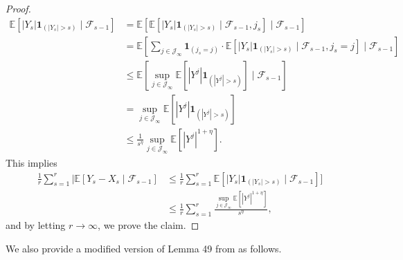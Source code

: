 \documentclass[12pt]{article}
\begin{document}
\begin{proof}
\begin{align*}
\mathbb{E}[ |Y_s| \mathbf{1}_{(|Y_s| > s)} \mid \mathcal{F}_{s-1} ] 
&= \mathbb{E}[ \mathbb{E}[ |Y_s| \mathbf{1}_{(|Y_s| > s)} \mid \mathcal{F}_{s-1}, j_s ] \mid \mathcal{F}_{s-1}]
\\ &= \mathbb{E}[ \sum_{j \in \mathcal{J}_{\infty}} \mathbf{1}_{(j_s = j)} \cdot \mathbb{E}[ |Y_s| \mathbf{1}_{(|Y_s| > s)} \mid \mathcal{F}_{s-1}, j_s = j] \mid \mathcal{F}_{s-1} ]
\\ &\le \mathbb{E}[ \sup_{j \in \mathcal{J}_{\infty}} \mathbb{E}[ |Y^j| \mathbf{1}_{(|Y^j| > s)}] \mid \mathcal{F}_{s-1} ]
\\ &= \sup_{j \in \mathcal{J}_{\infty}} \mathbb{E}[ |Y^j| \mathbf{1}_{(|Y^j| > s)}]
\\ &\le \frac{1}{s^{\eta}} \sup_{j \in \mathcal{J}_{\infty}} \mathbb{E}[ |Y^j|^{1 + \eta} ].
\end{align*}
This implies 
\begin{align*}
\frac{1}{r} \sum_{s=1}^{r} | \mathbb{E}[ Y_s - X_s \mid \mathcal{F}_{s-1} ] 
&\le \frac{1}{r} \sum_{s=1}^{r} \mathbb{E}[ |Y_s| \mathbf{1}_{(|Y_s| > s)} \mid \mathcal{F}_{s-1}]]
\\ &\le \frac{1}{r} \sum_{s=1}^{r} \frac{\sup_{j \in \mathcal{J}_{\infty}} \mathbb{E}[ |Y^j|^{1+\eta}] }{s^{\eta}}, 
\end{align*}
and by letting $r \to \infty$, we prove the claim.
\end{proof}

We also provide a modified version of Lemma 49 from  as follows.  
\end{document}

